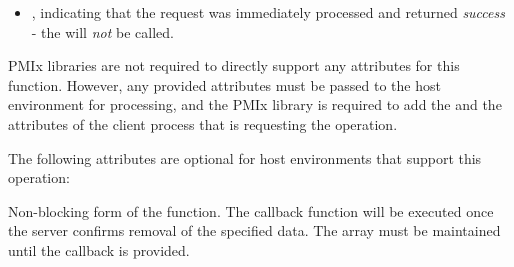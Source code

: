 \begin{arglist}
\end{arglist}

\returnsimplenb

\returnstart
\begin{itemize}
    \item {}, indicating that the request was immediately processed and returned \textit{success} - the  will \textit{not} be called.
\end{itemize}
\returnend

\reqattrstart
\ac{PMIx} libraries are not required to directly support any attributes for this function. However, any provided attributes must be passed to the host environment for processing, and the \ac{PMIx} library is required to add the  and the  attributes of the client process that is requesting the operation.

\reqattrend

\optattrstart
The following attributes are optional for host environments that support this operation:


\optattrend

\descr

Non-blocking form of the  function.
The callback function will be executed once the server confirms removal of the specified data. The  array must be maintained until the callback is provided.



\section{}

